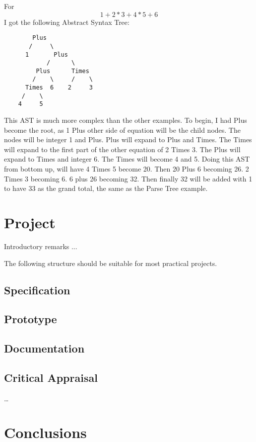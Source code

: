 \documentclass{article}
\theoremstyle{theorem}
\theoremstyle{definition}
\theoremstyle{remark}
\begin{document}
\noindent\newline\newline For $$1+2*3+4*5+6$$ I got the following Abstract Syntax Tree:

\begin{verbatim}
        Plus
       /     \
      1       Plus
            /      \
         Plus      Times
        /    \     /    \
      Times  6    2     3 
     /    \
    4     5
\end{verbatim}
\noindent\newline This AST is much more complex than the other examples. To begin, I had Plus become the root, as 1 Plus other side of equation will be the child nodes. The nodes will be integer 1 and Plus. Plus will expand to Plus and Times. The Times will expand to the first part of the other equation of 2 Times 3. The Plus will expand to Times and integer 6. The Times will become 4 and 5. Doing this AST from bottom up, will have 4 Times 5 become 20. Then 20 Plus 6 becoming 26. 2 Times 3 becoming 6. 6 plus 26 becoming 32. Then finally 32 will be added with 1 to have 33 as the grand total, the same as the Parse Tree example.

\section{Project}

Introductory remarks ...

The following structure should be suitable for most practical projects. 

\subsection{Specification}
\subsection{Prototype}
\subsection{Documentation}
\subsection{Critical Appraisal}

\ldots

\section{Conclusions}\label{conclusions}
\end{document}
